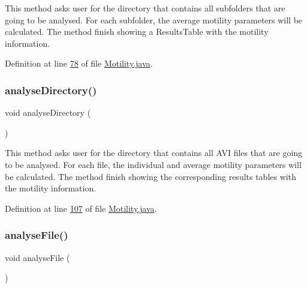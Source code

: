 This method asks user for the directory that contains all subfolders that are going to be analysed. For each subfolder, the average motility parameters will be calculated. The method finish showing a Results\+Table with the motility information. 

Definition at line \hyperlink{_motility_8java_source_l00078}{78} of file \hyperlink{_motility_8java_source}{Motility.\+java}.

\hypertarget{classanalysis_1_1_motility_ad8447fb7554f7f126822c7a3f3f680ce}{}\label{classanalysis_1_1_motility_ad8447fb7554f7f126822c7a3f3f680ce} 
\subsubsection{\texorpdfstring{analyse\+Directory()}{analyseDirectory()}}
{\footnotesize\ttfamily void analyse\+Directory (\begin{DoxyParamCaption}{ }\end{DoxyParamCaption})\hspace{0.3cm}{\ttfamily [private]}}

This method asks user for the directory that contains all A\+VI files that are going to be analysed. For each file, the individual and average motility parameters will be calculated. The method finish showing the corresponding results tables with the motility information. 

Definition at line \hyperlink{_motility_8java_source_l00107}{107} of file \hyperlink{_motility_8java_source}{Motility.\+java}.

\hypertarget{classanalysis_1_1_motility_a0b1464e818c4300782cb7e3322448f95}{}\label{classanalysis_1_1_motility_a0b1464e818c4300782cb7e3322448f95} 
\subsubsection{\texorpdfstring{analyse\+File()}{analyseFile()}}
{\footnotesize\ttfamily void analyse\+File (\begin{DoxyParamCaption}{ }\end{DoxyParamCaption})\hspace{0.3cm}{\ttfamily [private]}}

